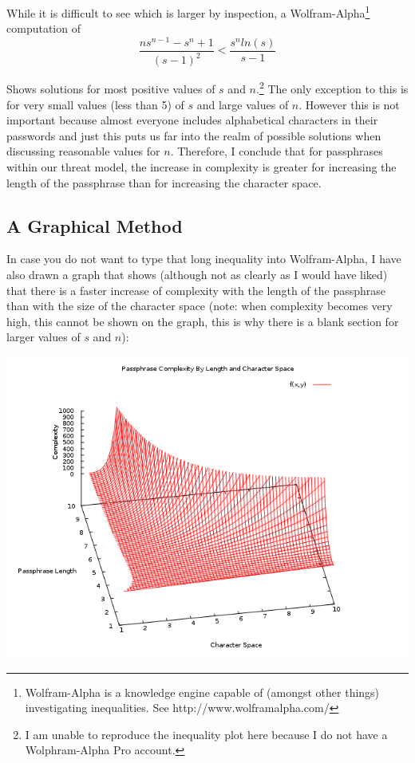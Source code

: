 \documentclass[11pt,a4paper]{article}
\begin{document}
While it is difficult to see which is larger by inspection, a Wolfram-Alpha\footnote{Wolfram-Alpha is a knowledge engine capable of (amongst other things) investigating inequalities. See http://www.wolframalpha.com/} computation of \[\frac{ns^{n-1}-s^n+1}{(s-1)^2} < \frac{s^n ln(s)}{s-1}\]

Shows solutions for most positive values of $s$ and $n$.\footnote{I am unable to reproduce the inequality plot here because I do not have a Wolphram-Alpha Pro account.} The only exception to this is for very small values (less than 5) of $s$ and large values of $n$. However this is not important because almost everyone includes alphabetical characters in their passwords and just this puts us far into the realm of possible solutions when discussing reasonable values for $n$. Therefore, I conclude that for passphrases within our threat model, the increase in complexity is greater for increasing the length of the passphrase than for increasing the character space.

\subsection{A Graphical Method}
In case you do not want to type that long inequality into Wolfram-Alpha, I have also drawn a graph that shows (although not as clearly as I would have liked) that there is a faster increase of complexity with the length of the passphrase than with the size of the character space (note: when complexity becomes very high, this cannot be shown on the graph, this is why there is a blank section for larger values of $s$ and $n$):

\includegraphics[scale=0.6]{graph1.png}
\pagebreak
\end{document}

